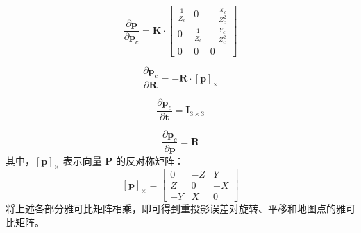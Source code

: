 \begin{equation}
\frac{\partial \symbf{p}}{\partial \symbf{p}_c} = \symbf{K} \cdot \begin{bmatrix}
\frac{1}{Z_c} & 0 & -\frac{X_c}{Z_c^2} \\
0 & \frac{1}{Z_c} & -\frac{Y_c}{Z_c^2} \\
0 & 0 & 0
\end{bmatrix}
\end{equation}

\begin{equation}
\frac{\partial \symbf{p}_c}{\partial \symbf{R}} = -\symbf{R} \cdot \left[ \symbf{p} \right]_\times
\end{equation}

\begin{equation}
\frac{\partial \symbf{p}_c}{\partial \symbf{t}} = \symbf{I}_{3 \times 3}
\end{equation}

\begin{equation}
\frac{\partial \symbf{p}_c}{\partial \symbf{p}} = \symbf{R}
\end{equation}
其中，\( \left[ \symbf{p} \right]_\times \) 表示向量 \( \symbf{P} \) 的反对称矩阵：
\begin{equation}
\left[ \symbf{p} \right]_\times = \begin{bmatrix}
0 & -Z & Y \\
Z & 0 & -X \\
-Y & X & 0
\end{bmatrix}
\end{equation}
将上述各部分雅可比矩阵相乘，即可得到重投影误差对旋转、平移和地图点的雅可比矩阵。

